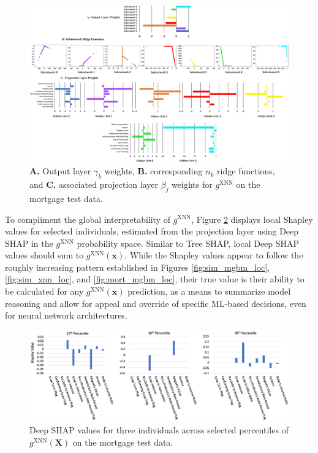 \documentclass[information,article,submit,moreauthors,pdftex]{definitions/mdpi}
\begin{document}
\begin{figure}[htb]
\hskip-20pt\includegraphics[width=18cm]{img/mort_xnn_glob_ridge.png}
\caption{\textbf{A.} Output layer $\gamma_k$ weights, \textbf{B.} corresponding $n_k$ ridge functions, and \textbf{C.} associated projection layer $\beta_j$ weights for $g^\text{XNN}$ on the mortgage test data.}
\label{fig:mort_xnn_glob_ridge}
\end{figure} 


To compliment the global interpretability of $g^\text{XNN}$, Figure \ref{fig:mort_xnn_loc} displays local Shapley values for selected individuals, estimated from the projection layer using Deep SHAP in the $g^\text{XNN}$ probability space. Similar to Tree SHAP, local Deep SHAP values should sum to $g^\text{XNN}(\mathbf{x})$. While the Shapley values appear to follow the roughly increasing pattern established in Figures \ref{fig:sim_mgbm_loc}, \ref{fig:sim_xnn_loc}, and \ref{fig:mort_mgbm_loc}, their true value is their ability to be calculated for any $g^\text{XNN}(\mathbf{x})$ prediction, as a means to summarize model reasoning and allow for appeal and override of specific ML-based decisions, even for neural network architectures. 

\begin{figure}[htb]
\centering
\includegraphics[width=16cm]{img/mort_xnn_loc.png}
\caption{Deep SHAP values for three individuals across selected percentiles of $g^\text{XNN}(\mathbf{X})$ on the mortgage test data.}
\label{fig:mort_xnn_loc}
\end{figure}
\end{document}
